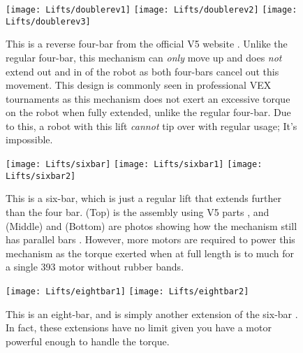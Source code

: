 \begin{figure}[h]
    \centering
    \texttt{[image: Lifts/doublerev1]}
    \texttt{[image: Lifts/doublerev2]}
    \texttt{[image: Lifts/doublerev3]}
    \caption{
    This is a reverse four-bar from the official V5 website \cite{V5Lifts}. Unlike the regular four-bar, this mechanism can \textit{only} move up and does \textit{not} extend out and in of the robot as both four-bars cancel out this movement. This design is commonly seen in professional VEX tournaments as this mechanism does not exert an excessive torque on the robot when fully extended, unlike the regular four-bar. Due to this, a robot with this lift \textit{cannot} tip over with regular usage; It's impossible.
    }
\end{figure}

\begin{figure}[h]
    \centering
    \texttt{[image: Lifts/sixbar]}
    \texttt{[image: Lifts/sixbar1]}
    \texttt{[image: Lifts/sixbar2]}
    \caption{
    This is a six-bar, which is just a regular lift that extends further than the four bar. (Top) is the assembly using V5 parts \cite{V5Lifts}, and (Middle) and (Bottom) are photos showing how the mechanism still has parallel bars \cite{KeplerLifts}. However, more motors are required to power this mechanism as the torque exerted when at full length is to much for a single 393 motor without rubber bands.
    }
\end{figure}

\begin{figure}[h]
    \centering
    \texttt{[image: Lifts/eightbar1]}
    \texttt{[image: Lifts/eightbar2]}
    \caption{
    This is an eight-bar, and is simply another extension of the six-bar \cite{KeplerLifts}. In fact, these extensions have no limit given you have a motor powerful enough to handle the torque.
    }
\end{figure}
